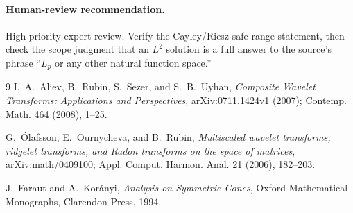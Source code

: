 \documentclass[11pt]{article}
\theoremstyle{remark}
\begin{document}
\paragraph{Human-review recommendation.}
High-priority expert review.  Verify the Cayley/Riesz safe-range statement,
then check the scope judgment that an $L^2$ solution is a full answer to the
source's phrase ``$L_p$ or any other natural function space.''

\begin{thebibliography}{9}
I.~A.~Aliev, B.~Rubin, S.~Sezer, and S.~B.~Uyhan,
\emph{Composite Wavelet Transforms: Applications and Perspectives},
arXiv:0711.1424v1 (2007); Contemp. Math. 464 (2008), 1--25.

G.~Ólafsson, E.~Ournycheva, and B.~Rubin,
\emph{Multiscaled wavelet transforms, ridgelet transforms, and Radon
transforms on the space of matrices},
arXiv:math/0409100; Appl. Comput. Harmon. Anal. 21 (2006), 182--203.

J.~Faraut and A.~Korányi,
\emph{Analysis on Symmetric Cones}, Oxford Mathematical Monographs,
Clarendon Press, 1994.
\end{thebibliography}
\end{document}
